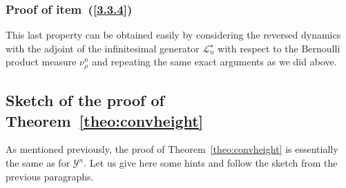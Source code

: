\documentclass[AHL,Unicode,longabstracts]{cedram}
\newcommand{\mc}[1]{{\mathcal #1}}
\renewcommand{\mc}[1]{{\mathcal #1}}
\begin{document}
\subsubsection{Proof of item~(\ref{3.3.4})}

This last property can be obtained easily by considering the reversed dynamics with the adjoint of the infinitesimal generator $\mc L_n^\star$ with respect to the Bernoulli product measure $\nu^n_{\rho}$ and repeating the same exact arguments as we did above.

\subsection{Sketch of the proof of Theorem~\ref{theo:convheight}}\label{app:height}

As mentioned previously, the proof of Theorem~\ref{theo:convheight} is essentially the same as for $\mc Y^n$. Let us give here some hints and follow the sketch from the previous paragraphs.
\end{document}
